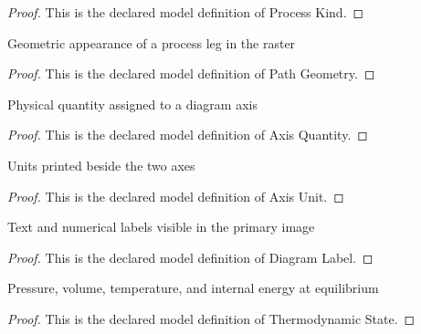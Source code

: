 \begin{proof}
  This is the declared model definition of Process Kind.
\end{proof}
\begin{definition}
  \label{def:physics:phyx-mini-0429:phyxminiproblems-problemphyxmini0429-pathgeometry}
  Geometric appearance of a process leg in the raster
\end{definition}
\begin{proof}
  This is the declared model definition of Path Geometry.
\end{proof}
\begin{definition}
  \label{def:physics:phyx-mini-0429:phyxminiproblems-problemphyxmini0429-axisquantity}
  Physical quantity assigned to a diagram axis
\end{definition}
\begin{proof}
  This is the declared model definition of Axis Quantity.
\end{proof}
\begin{definition}
  \label{def:physics:phyx-mini-0429:phyxminiproblems-problemphyxmini0429-axisunit}
  Units printed beside the two axes
\end{definition}
\begin{proof}
  This is the declared model definition of Axis Unit.
\end{proof}
\begin{definition}
  \label{def:physics:phyx-mini-0429:phyxminiproblems-problemphyxmini0429-diagramlabel}
  Text and numerical labels visible in the primary image
\end{definition}
\begin{proof}
  This is the declared model definition of Diagram Label.
\end{proof}
\begin{definition}
  \label{def:physics:phyx-mini-0429:phyxminiproblems-problemphyxmini0429-thermodynamicstate}
  Pressure, volume, temperature, and internal energy at equilibrium
\end{definition}
\begin{proof}
  This is the declared model definition of Thermodynamic State.
\end{proof}
